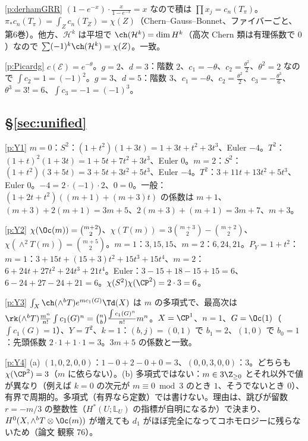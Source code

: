 \begin{sol}{\ref{p:derhamGRR}}
$(1-e^{-x})\cdot\frac x{1-e^{-x}}=x$ なので積は $\prod x_j=c_n(T_\pi)$。$\pi_*c_n(T_\pi)=\int_Zc_n(T_Z)=\chi(Z)$（Chern--Gauss--Bonnet、ファイバーごと、第6巻）。他方、$\mathcal H^k$ は平坦で $\ch(\mathcal H^k)=\dim H^k$（高次 Chern 類は有理係数で $0$）なので $\sum(-1)^k\ch(\mathcal H^k)=\chi(Z)$。一致。
\end{sol}
\begin{sol}{\ref{p:Picardg}}
$c(\mathcal E)=e^{-\theta}$。$g=2$、$d=3$：階数 $2$、$c_1=-\theta$、$c_2=\frac{\theta^2}2$、$\theta^2=2$ なので $\int c_2=1=(-1)^2$。$g=3$、$d=5$：階数 $3$、$c_1=-\theta$、$c_2=\frac{\theta^2}2$、$c_3=-\frac{\theta^3}6$、$\theta^3=3!=6$、$\int c_3=-1=(-1)^3$。
\end{sol}
\subsection*{\S\ref{sec:unified}}
\begin{sol}{\ref{p:Y1}}
$m=0$：$S^2$：$(1+t^2)(1+3t)=1+3t+t^2+3t^3$、Euler $-4$。$T^2$：$(1+t)^2(1+3t)=1+5t+7t^2+3t^3$、Euler $0$。$m=2$：$S^2$：$(1+t^2)(3+5t)=3+5t+3t^2+5t^3$、Euler $-4$。$T^2$：$3+11t+13t^2+5t^3$、Euler $0$。$-4=2\cdot(-1)\cdot2$、$0=0$。一般：$(1+2t+t^2)((m+1)+(m+3)t)$ の係数は $m+1$、$(m+3)+2(m+1)=3m+5$、$2(m+3)+(m+1)=3m+7$、$m+3$。
\end{sol}
\begin{sol}{\ref{p:Y2}}
$\chi(\Oc(m))=\binom{m+2}2$、$\chi(T(m))=3\binom{m+3}2-\binom{m+2}2$、$\chi(\wedge^2T(m))=\binom{m+5}2$。$m=1$：$3,15,15$、$m=2$：$6,24,21$。$P_Y=1+t^2$：$m=1$：$3+15t+(15+3)t^2+15t^3+15t^4$、$m=2$：$6+24t+27t^2+24t^3+21t^4$。Euler：$3-15+18-15+15=6$、$6-24+27-24+21=6$。$\chi(S^2)\chi(\CP^2)=2\cdot3=6$。
\end{sol}
\begin{sol}{\ref{p:Y3}}
$\int_X\ch(\wedge^bT)e^{mc_1(G)}\Td(X)$ は $m$ の多項式で、最高次は $\rk(\wedge^bT)\frac{m^n}{n!}\int c_1(G)^n=\binom nb\frac{\int c_1(G)^n}{n!}m^n$。$X=\CP^1$、$n=1$、$G=\Oc(1)$（$\int c_1(G)=1$）、$Y=T^2$、$k=1$：$(b,j)=(0,1)$ で $b_1=2$、$(1,0)$ で $b_0=1$：先頭係数 $2\cdot1+1\cdot1=3$。$3m+5$ の係数と一致。
\end{sol}
\begin{sol}{\ref{p:Y4}}
(a) $(1,0,2,0,0)$：$1-0+2-0+0=3$、$(0,0,3,0,0)$：$3$。どちらも $\chi(\CP^2)=3$（$m$ に依らない）。(b) 多項式ではない：$m\in3\Z_{\ge0}$ とそれ以外で値が異なり（例えば $k=0$ の次元が $m\equiv0\bmod 3$ のとき $1$、そうでないとき $0$）、有界で周期的。多項式（有界なら定数）では書けない。理由は、跳びが留数 $r=-m/3$ の整数性（$H^*(U;\mathbb L_U)$ の指標が自明になるか）で決まり、$H^0(X,\wedge^bT\otimes\Oc(m))$ が増えても $d_1$ がほぼ完全になってコホモロジーに残らないため（論文 観察 76）。
\end{sol}
